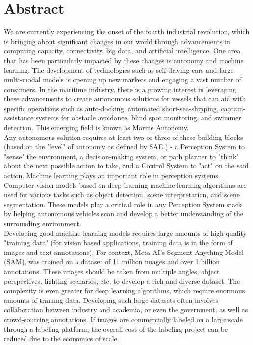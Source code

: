 \chapter{Abstract}

We are currently experiencing the onset of the fourth industrial revolution, which is bringing about significant changes in our world through advancements in computing capacity, connectivity, big data, and artificial intelligence\cite{velarde2020artificial}. One area that has been particularly impacted by these changes is autonomy and machine learning. The development of technologies such as self-driving cars\cite{bertoncello2015ten} and large multi-modal models\cite{zhao2023survey} is opening up new markets and engaging a vast number of consumers. In the maritime industry, there is a growing interest in leveraging these advancements to create autonomous solutions for vessels\cite{gu2021autonomous} that can aid with specific operations such as auto-docking, automated short-sea-shipping, captain-assistance systems for obstacle avoidance, blind spot monitoring, and swimmer detection. This emerging field is known as Marine Autonomy. \\

Any autonomous solution requires at least two or three of these building blocks (based on the "level" of autonomy as defined by SAE \cite{on2014taxonomy}) - a Perception System to "sense" the environment, a decision-making system, or path planner to "think" about the next possible action to take, and a Control System to "act" on the said action\cite{bagloee2016autonomous}. Machine learning plays an important role in perception systems. Computer vision models based on deep learning machine learning algorithms are used for various tasks such as object detection, scene interpretation, and scene segmentation\cite{voulodimos2018deep}. These models play a critical role in any Perception System stack by helping autonomous vehicles scan and develop a better understanding of the surrounding environment.\cite{hane20173d} \\

Developing good machine learning models requires large amounts of high-quality "training data" (for vision based applications, training data is in the form of images and text annotations).\cite{radiuk2017impact} For context, Meta AI's Segment Anything Model (SAM), was trained on a dataset of 11 million images and over 1 billion annotations.\cite{kirillov2023segment} These images should be taken from multiple angles, object perspectives, lighting scenarios, etc, to develop a rich and diverse dataset. The complexity is even greater for deep learning algorithms, which require enormous amounts of training data.\cite{radiuk2017impact} Developing such large datasets often involves collaboration between industry and academia, or even the government, as well as crowd-sourcing annotations. If images are commercially labeled on a large scale through a labeling platform, the overall cost of the labeling project can be reduced due to the economics of scale.\cite{janai2020computer} \\

